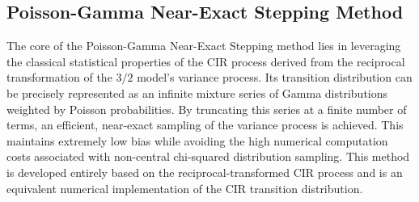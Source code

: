 \subsection{Poisson-Gamma Near-Exact Stepping Method}
The core of the Poisson-Gamma Near-Exact Stepping method lies in leveraging the classical statistical properties of the CIR process derived from the reciprocal transformation of the $3/2$ model's variance process. Its transition distribution can be precisely represented as an infinite mixture series of Gamma distributions weighted by Poisson probabilities. By truncating this series at a finite number of terms, an efficient, near-exact sampling of the variance process is achieved. This maintains extremely low bias while avoiding the high numerical computation costs associated with non-central chi-squared distribution sampling. This method is developed entirely based on the reciprocal-transformed CIR process and is an equivalent numerical implementation of the CIR transition distribution.

